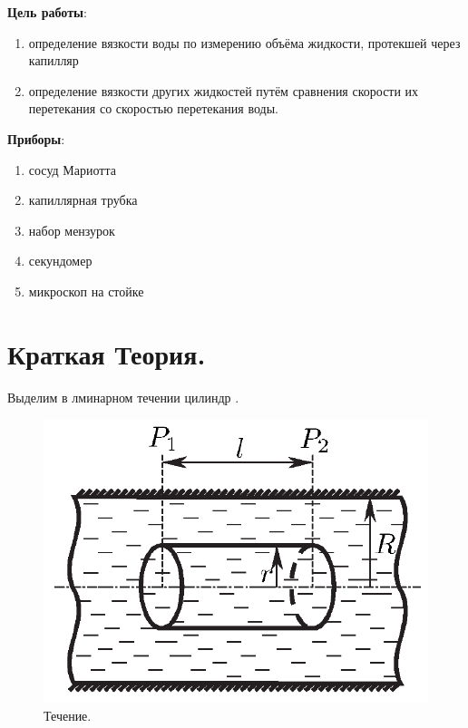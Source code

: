 \documentclass[a4paper, 12pt]{article}
\begin{document}

\tableofcontents
\listoffigures \listoftables

\newpage

\textbf{Цель работы}:
\begin{enumerate}
  \item определение вязкости воды по измерению объёма жидкости, протекшей
        через капилляр

  \item определение вязкости других жидкостей путём сравнения скорости их перетекания
        со скоростью перетекания воды.
\end{enumerate}

\textbf{Приборы}:
\begin{enumerate}
  \item сосуд Мариотта

  \item капиллярная трубка

  \item набор мензурок

  \item секундомер

  \item микроскоп на стойке
\end{enumerate}

\section{Краткая Теория.}

Выделим в лминарном течении цилиндр .

\begin{figure}[H]
  \center
  \includegraphics[scale=0.4]{data/pic1.png}
  \caption{Течение. \label{fig:flux}}
\end{figure}
\end{document}
